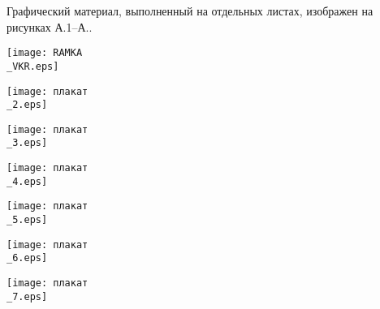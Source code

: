
Графический материал, выполненный на отдельных листах,
изображен на рисунках А.1--А..
\setcounter{числоПлакатов}{0}

\renewcommand{\thefigure}{А.\arabic{figure}} %

\begin{landscape}

\begin{плакат}
    \texttt{[image: RAMKA\\\_VKR.eps]}
    \label{RAMKA_VKR.eps:image}      
\end{плакат}

\begin{плакат}
    \texttt{[image: плакат\\\_2.eps]}
    \label{плакат_2.eps:image}      
\end{плакат}

\begin{плакат}
    \texttt{[image: плакат\\\_3.eps]}
    \label{плакат_3.eps:image}      
\end{плакат}

\begin{плакат}
	\texttt{[image: плакат\\\_4.eps]}
	\label{плакат_4.eps:image}      
\end{плакат}

\begin{плакат}
	\texttt{[image: плакат\\\_5.eps]}
	\label{плакат_5.eps:image}      
\end{плакат}

\begin{плакат}
	\texttt{[image: плакат\\\_6.eps]}
	\label{плакат_6.eps:image}      
\end{плакат}

\begin{плакат}
	\texttt{[image: плакат\\\_7.eps]}
	\label{плакат_7.eps:image}      
\end{плакат}

\end{landscape}
